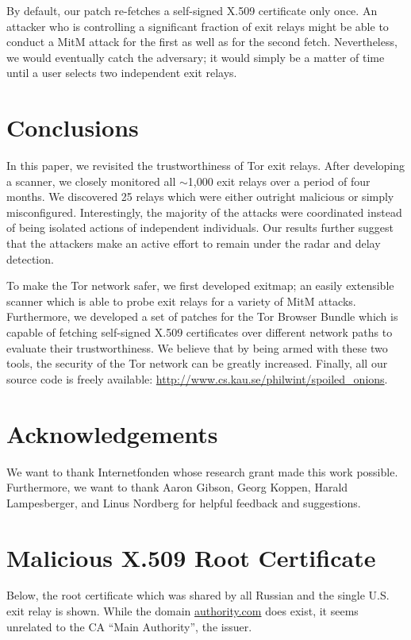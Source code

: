 \documentclass[letterpaper,twocolumn,10pt]{article}
\begin{document}
By default, our patch re-fetches a self-signed X.509 certificate only once.  An attacker who is
controlling a significant fraction of exit relays might be able to conduct a MitM attack for the
first as well as for the second fetch.  Nevertheless, we would eventually catch the adversary; it
would simply be a matter of time until a user selects two independent exit relays.

\section{Conclusions}
\label{sec:conclusions}
In this paper, we revisited the trustworthiness of Tor exit relays.  After developing a scanner, we
closely monitored all $\sim$1,000 exit relays over a period of four months.  We discovered 25 relays
which were either outright malicious or simply misconfigured.  Interestingly, the majority of the
attacks were coordinated instead of being isolated actions of independent individuals.  Our results
further suggest that the attackers make an active effort to remain under the radar and delay
detection.

To make the Tor network safer, we first developed \textsf{exitmap}; an easily extensible scanner
which is able to probe exit relays for a variety of MitM attacks.  Furthermore, we developed a set
of patches for the Tor Browser Bundle which is capable of fetching self-signed X.509 certificates
over different network paths to evaluate their trustworthiness.  We believe that by being armed with
these two tools, the security of the Tor network can be greatly increased.  Finally, all our source
code is freely available: \url{http://www.cs.kau.se/philwint/spoiled_onions}.

\section*{Acknowledgements}
We want to thank Internetfonden whose research grant made this work possible.  Furthermore, we want
to thank Aaron Gibson, Georg Koppen, Harald Lampesberger, and Linus Nordberg for helpful feedback
and suggestions.

\printbibliography

\appendix

\section{Malicious X.509 Root Certificate}
\label{app:x509}
Below, the root certificate which was shared by all Russian and the single U.S. exit relay is shown.
While the domain \url{authority.com} does exist, it seems unrelated to the CA ``Main Authority'',
the issuer.
\end{document}
